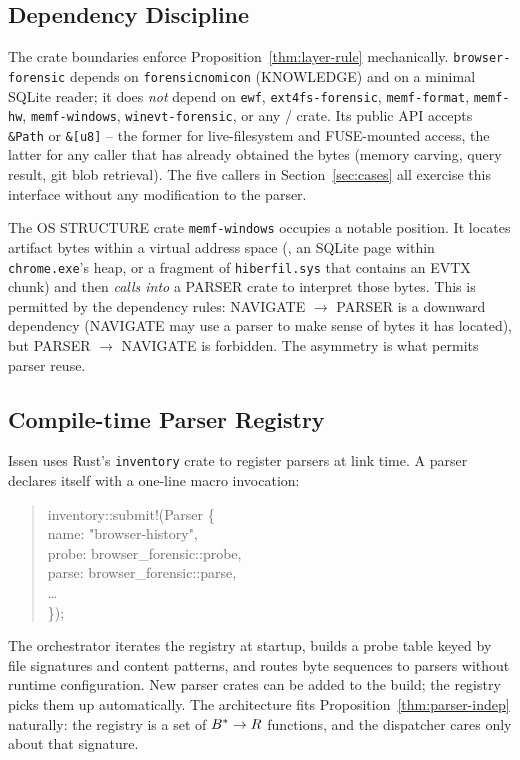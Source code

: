 \subsection{Dependency Discipline}

The crate boundaries enforce Proposition~\ref{thm:layer-rule} mechanically.
\texttt{browser-forensic} depends on \texttt{forensicnomicon} (KNOWLEDGE) and
on a minimal SQLite reader; it does \emph{not} depend on \texttt{ewf},
\texttt{ext4fs-forensic}, \texttt{memf-format}, \texttt{memf-hw},
\texttt{memf-windows}, \texttt{winevt-forensic}, or any /
crate. Its public API accepts \texttt{\&Path} or \texttt{\&[u8]} -- the
former for live-filesystem and FUSE-mounted access, the latter for any
caller that has already obtained the bytes (memory carving, query result,
git blob retrieval). The five callers in
Section~\ref{sec:cases} all exercise this interface without any modification
to the parser.

The OS STRUCTURE crate \texttt{memf-windows} occupies a notable position. It
locates artifact bytes within a virtual address space (\eg{}, an SQLite page
within \texttt{chrome.exe}'s heap, or a fragment of \texttt{hiberfil.sys}
that contains an EVTX chunk) and then \emph{calls into} a PARSER crate to
interpret those bytes. This is permitted by the dependency rules: NAVIGATE
$\to$ PARSER is a downward dependency (NAVIGATE may use a parser to make
sense of bytes it has located), but PARSER $\to$ NAVIGATE is forbidden.
The asymmetry is what permits parser reuse.

\subsection{Compile-time Parser Registry}

Issen uses Rust's \texttt{inventory} crate to register parsers at link time.
A parser declares itself with a one-line macro invocation:
\begin{quote}\small\ttfamily
inventory::submit!(Parser \{ \\
\hspace*{1em} name: "browser-history", \\
\hspace*{1em} probe: browser\_forensic::probe, \\
\hspace*{1em} parse: browser\_forensic::parse, \\
\hspace*{1em} \ldots \\
\});
\end{quote}
The orchestrator iterates the registry at startup, builds a probe table
keyed by file signatures and content patterns, and routes byte sequences to
parsers without runtime configuration. New parser crates can be added to the
build; the registry picks them up automatically. The architecture fits
Proposition~\ref{thm:parser-indep} naturally: the registry is a set of $B^{*}
\to R$ functions, and the dispatcher cares only about that signature.

